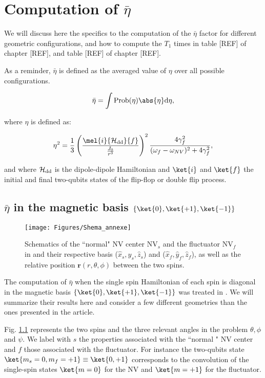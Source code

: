 \documentclass[a4paper,11pt]{report}
\title{}
\begin{document}
\chapter{Computation of $\bar \eta$}
We will discuss here the specifics to the computation of the  $\bar \eta$ factor for different geometric configurations, and how to compute the $T_1$ times in table [REF] of chapter [REF], and table [REF] of chapter [REF].

As a reminder, $\bar \eta$ is defined as the averaged value of $\eta$ over all possible configurations.

\begin{equation}
\bar \eta = \int \rm{Prob}(\eta) \abs{\eta} d\eta,
\end{equation}

where $\eta$ is defined as:

\begin{equation}
\label{eq. eta debut annexe}
\eta^2=\frac{1}{3} \left(\frac{\mel{i}{\mathcal{H_{\rm dd}}}{f}}{\frac{J_0}{r^3}}\right)^2 \frac{4\gamma_f^2}{(\omega_f - \omega_{NV})^2+4\gamma_f^2},
\end{equation}

and where $\mathcal{H_{\rm dd}}$ is the dipole-dipole Hamiltonian and $\ket{i}$ and $\ket{f}$ the initial and final two-qubits states of the flip-flop or double flip process.

\section{$\bar \eta$ in the magnetic basis $\{ \ket{0}, \ket{+1}, \ket{-1}\}$}

\begin{figure}[h]
\centering
\texttt{[image: Figures/Shema\_annexe]}
\caption{Schematics of the ``normal" NV center NV$_s$ and the fluctuator NV$_f$ in and their respective basis ($\hat x_s,\hat y_s,\hat z_s$) and ($\hat x_f,\hat y_f,\hat z_f$), as well as the relative position $\mathbf{r}(r,\theta,\phi)$ between the two spins.}
\label{shema spins annexe}
\end{figure}

The computation of $\bar \eta$ when the single spin Hamiltonian of each spin is diagonal in the magnetic basis $\{ \ket{0}, \ket{+1}, \ket{-1}\}$ was treated in \citep{choi2017depolarization}. We will summarize their results here and consider a few different geometries than the ones presented in the article.

Fig. \ref{shema spins annexe} represents the two spins and the three relevant angles in the problem $\theta,\phi$ and $\psi$. We label with $s$ the properties associated with the ``normal " NV center and $f$ those associated with the fluctuator. For instance the two-qubits state $\ket{m_s=0,m_f=+1}\equiv\ket{0,+1}$ corresponds to the convolution of the single-spin states $\ket{m=0}$ for the NV and $\ket{m=+1}$ for the fluctuator.
\end{document}
